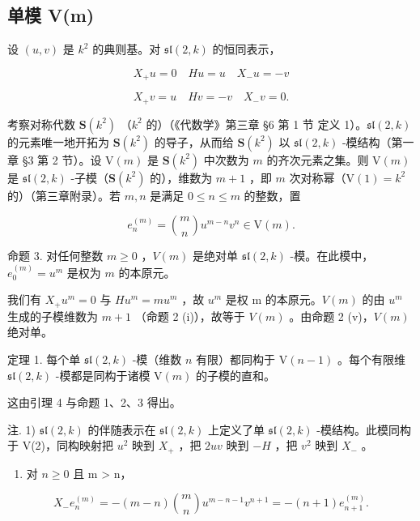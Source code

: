 \subsection{单模 V(m)}

设 \((u,v)\) 是 \(k^2\) 的典则基。对 \(\mathfrak{sl}(2,k)\) 的恒同表示，

\[
X _ {+} u = 0 \quad H u = u \quad X _ {-} u = - v
\]

\[
X _ {+} v = u \quad H v = - v \quad X _ {-} v = 0.
\]

考察对称代数 \(\mathbf{S}(k^2)\) （\(k^2\) 的）（《代数学》第三章 §6 第 1 节 定义 1）。\(\mathfrak{sl}(2,k)\) 的元素唯一地开拓为 \(\mathbf{S}(k^2)\) 的导子，从而给 \(\mathbf{S}(k^2)\) 以 \(\mathfrak{sl}(2,k)\) -模结构（第一章 §3 第 2 节）。设 \(\mathrm{V}(m)\) 是 \(\mathbf{S}(k^2)\) 中次数为 \(m\) 的齐次元素之集。则 \(\mathrm{V}(m)\) 是 \(\mathfrak{sl}(2,k)\) -子模（\(\mathbf{S}(k^2)\) 的），维数为 \(m + 1\) ，即 \(m\) 次对称幂（\(\mathrm{V}(1) = k^2\) 的）（第三章附录）。若 \(m,n\) 是满足 \(0 \leq n \leq m\) 的整数，置

\[
e _ {n} ^ {(m)} = \binom {m} {n} u ^ {m - n} v ^ {n} \in \mathrm{V} (m).
\]

命题 3. 对任何整数 \(m \geq 0\) ，\(V(m)\) 是绝对单 \(\mathfrak{sl}(2, k)\) -模。在此模中，\(e_0^{(m)} = u^m\) 是权为 \(m\) 的本原元。

我们有 \(X_{+}u^{m}=0\) 与 \(Hu^{m}=mu^{m}\) ，故 \(u^{m}\) 是权 m 的本原元。\(V(m)\) 的由 \(u^{m}\) 生成的子模维数为 \(m+1\) （命题 2 (i)），故等于 \(V(m)\) 。由命题 2 (v)，\(V(m)\) 绝对单。

定理 1. 每个单 \(\mathfrak{sl}(2,k)\) -模（维数 \(n\) 有限）都同构于 \(\mathrm{V}(n - 1)\) 。每个有限维 \(\mathfrak{sl}(2,k)\) -模都是同构于诸模 \(\mathrm{V}(m)\) 的子模的直和。

这由引理 4 与命题 1、2、3 得出。

注. 1) \(\mathfrak{sl}(2,k)\) 的伴随表示在 \(\mathfrak{sl}(2,k)\) 上定义了单 \(\mathfrak{sl}(2,k)\) -模结构。此模同构于 V(2)，同构映射把 \(u^2\) 映到 \(X_+\) ，把 \(2uv\) 映到 \(-H\) ，把 \(v^2\) 映到 \(X_-\) 。

\begin{enumerate}
\def\labelenumi{\arabic{enumi})}
\setcounter{enumi}{1}
\tightlist
\item
  对 \(n \geq 0\) 且 m \textgreater{} n，
\end{enumerate}

\[
X _ {-} e _ {n} ^ {(m)} = - (m - n) \binom{m}{n} u ^ {m - n - 1} v ^ {n + 1} = - (n + 1) e _ {n + 1} ^ {(m)}.
\]

